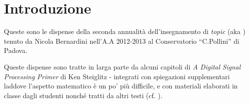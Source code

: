 %
%

\chapter{Introduzione}

Queste sono le dispense della seconda annualit\`a dell'insegnamento di \emph{topic}
(aka \emph{\topicacro}) tenuto da Nicola Bernardini nell'A.A 2012-2013 al
Conservatorio ``C.Pollini'' di Padova.

Queste dispense sono tratte in larga parte da alcuni capitoli di \emph{A Digital Signal Processing Primer}
di Ken Steiglitz \cite{steiglitz:adspp} - integrati
con spiegazioni supplementari laddove l'aspetto matematico \`e un po' pi\`u
difficile,
e con materiali elaborati in
classe dagli studenti
nonch\'e tratti da altri testi
(cf. \cite{steiglitz1974, t1987digital, park2010, shenoi2005}).
